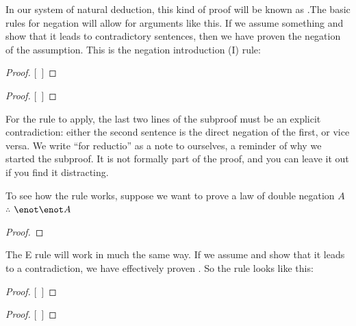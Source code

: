 In our system of natural deduction, this kind of proof will be known as .The basic rules for negation will allow for arguments like this. If we assume something and show that it leads to contradictory sentences, then we have proven the negation of the assumption. This is the negation introduction ({\enot}I) rule:

\begin{multicols}{2}

\begin{proof}
\open
\close
{}[\ ]{\enot{}}
\end{proof}

\begin{proof}
\open
\close
{}[\ ]{\enot{}}
\end{proof}

\end{multicols}


For the rule to apply, the last two lines of the subproof must be an explicit contradiction: either the second sentence is the direct negation of the first, or vice versa. We write ``for reductio'' as a note to ourselves, a reminder of why we started the subproof. It is not formally part of the proof, and you can leave it out if you find it distracting.

To see how the rule works, suppose we want to prove a law of double negation $A$ $\therefore$ $\enot \enot A$
\label{DN1}

\begin{proof}
 
	\open
	 
	 
	 
	\close
{} 
\end{proof}

The {\enot}E rule will work in much the same way. If we assume \enot{} and show that it leads to a contradiction, we have effectively proven . So the rule looks like this:

\begin{multicols}{2}
\begin{proof}
\open
\close
{}[\ ]{}
\end{proof}


\begin{proof}
\open
\close
{}[\ ]{}

\end{proof}
\end{multicols}

